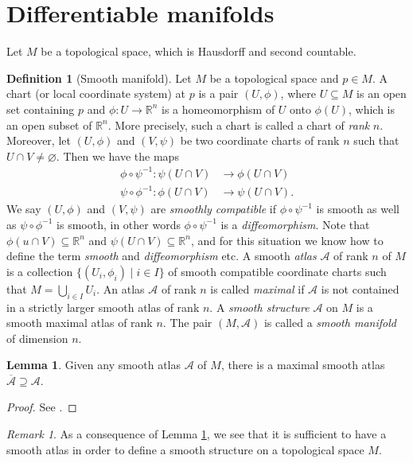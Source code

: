 \documentclass[11pt]{amsart}
\numberwithin{equation}{section}
\theoremstyle{plain}
\theoremstyle{definition}
\newtheorem{defn}{Definition}[subsection]
\newtheorem{lem}{Lemma}[subsection]
\theoremstyle{remark}
\newtheorem{rem}{Remark}[subsection]
\newcommand{\R}{\mathbb{R}}
\newcommand{\calA}{\mathcal{A}}
\begin{document}
\section{Differentiable manifolds}
Let $M$ be a topological space, which is Hausdorff and second countable.
\begin{defn}[Smooth manifold]
Let $M$ be a topological space and $p\in M$. A chart (or local coordinate system) at $p$ is a pair $(U,\phi)$, where $U\subseteq M$ is an open set containing $p$ and $\phi\colon U\to \R^n$ is a homeomorphism of $U$ onto $\phi(U)$, which is an open subset of $\R^n$. More precisely, such a chart is called a chart of \emph{rank} $n$. Moreover, let $(U,\phi)$ and $(V,\psi)$ be two coordinate charts of rank $n$ such that $U\cap V\not=\varnothing$. Then we have the maps
\begin{align*}
\phi\circ\psi^{-1}\colon \psi(U\cap V)&\to \phi(U\cap V)\\
\psi\circ\phi^{-1}\colon \phi(U\cap V)&\to \psi(U\cap V).
\end{align*}
We say $(U,\phi)$ and $(V,\psi)$ are \emph{smoothly compatible} if $\phi\circ\psi^{-1}$ is smooth as well as $\psi\circ \phi^{-1}$ is smooth, in other words $\phi\circ\psi^{-1}$ is a \emph{diffeomorphism}. Note that $\phi(u\cap V)\subseteq \R^n$ and $\psi(U\cap V)\subseteq\R^n$, and for this situation we know how to define the term \emph{smooth} and \emph{diffeomorphism} etc. A smooth \emph{atlas} $\calA$ of rank $n$ of $M$ is a collection $\{(U_i,\phi_i)\mid i\in I\}$ of smooth compatible coordinate charts such that $M=\bigcup_{i\in I}U_i$. An atlas $\calA$ of rank $n$ is called \emph{maximal} if $\calA$ is not contained in a strictly larger smooth atlas of rank $n$. A \emph{smooth structure} $\calA$ on $M$ is a smooth maximal atlas of rank $n$. The pair $(M,\calA)$ is called a \emph{smooth manifold} of dimension $n$.
\end{defn}

\begin{lem}
\label{atlas}
Given any smooth atlas $\calA$ of $M$, there is a maximal smooth atlas $\overline{\calA}\supseteq \calA$.
\end{lem}

\begin{proof}
See \cite{Lee}.
\end{proof}

\begin{rem}
As a consequence of Lemma \ref{atlas}, we see that it is sufficient to have a smooth atlas in order to define a smooth structure on a topological space $M$.
\end{rem}
\end{document}
